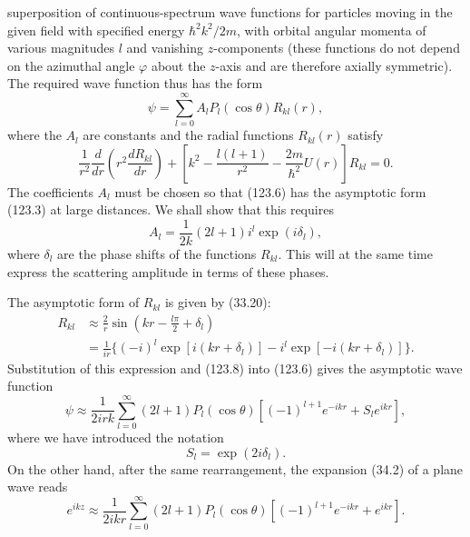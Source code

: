 superposition of continuous-spectrum wave functions for particles moving in
the given field with specified energy $\hbar^2k^2/2m$, with orbital angular
momenta of various magnitudes $l$ and vanishing $z$-components (these
functions do not depend on the azimuthal angle $\varphi$ about the $z$-axis
and are therefore axially symmetric). The required wave function thus has the
form
\begin{equation}
 \psi=\sum_{l=0}^\infty A_lP_l(\cos\theta)R_{kl}(r),
 \tag{123.6}
\end{equation}
where the $A_l$ are constants and the radial functions $R_{kl}(r)$ satisfy
\begin{equation}
 \frac1{r^2}\frac d{dr}\left(r^2\frac{dR_{kl}}{dr}\right)
 +\left[k^2-\frac{l(l+1)}{r^2}-\frac{2m}{\hbar^2}U(r)\right]R_{kl}=0.
 \tag{123.7}
\end{equation}
The coefficients $A_l$ must be chosen so that (123.6) has the asymptotic form
(123.3) at large distances. We shall show that this requires
\begin{equation}
 A_l=\frac1{2k}(2l+1)i^l\exp(i\delta_l),
 \tag{123.8}
\end{equation}
where $\delta_l$ are the phase shifts of the functions $R_{kl}$. This will at
the same time express the scattering amplitude in terms of these phases.

The asymptotic form of $R_{kl}$ is given by (33.20):
\[
 \begin{split}
 R_{kl}&\approx\frac2r\sin\left(kr-\frac{l\pi}{2}+\delta_l\right)\\
 &=\frac1{ir}\{(-i)^l\exp[i(kr+\delta_l)]
 -i^l\exp[-i(kr+\delta_l)]\}.
 \end{split}
\]
Substitution of this expression and (123.8) into (123.6) gives the asymptotic
wave function
\begin{equation}
 \psi\approx\frac1{2irk}\sum_{l=0}^\infty(2l+1)P_l(\cos\theta)
 [(-1)^{l+1}e^{-ikr}+S_le^{ikr}],
 \tag{123.9}
\end{equation}
where we have introduced the notation
\begin{equation}
 S_l=\exp(2i\delta_l).
 \tag{123.10}
\end{equation}
On the other hand, after the same rearrangement, the expansion (34.2) of a
plane wave reads
\[
 e^{ikz}\approx\frac1{2ikr}\sum_{l=0}^\infty(2l+1)P_l(\cos\theta)
 [(-1)^{l+1}e^{-ikr}+e^{ikr}].
\]

